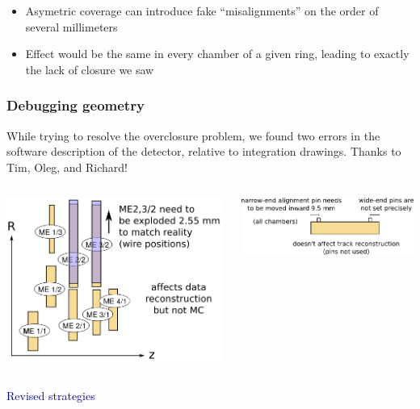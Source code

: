 \documentclass[compress]{beamer}
\begin{document}
\begin{frame}
\begin{columns}
\end{columns}

\vfill
\begin{itemize}
\item Asymetric coverage can introduce fake ``misalignments'' on the order of several millimeters
\item Effect would be the same in every chamber of a given ring, leading to exactly the lack of closure we saw
\end{itemize}
\end{frame}

\begin{frame}
\frametitle{Debugging geometry}
\small

\vfill
While trying to resolve the overclosure problem, we found two errors
in the software description of the detector, relative to integration
drawings.  Thanks to Tim, Oleg, and Richard!

\vfill
\begin{columns}
\hfill \includegraphics[width=0.85\linewidth]{expand_ME22_32.png}

\includegraphics[width=0.85\linewidth]{move_all_pins.png}
\end{columns}

\vfill 
\begin{columns}
\textcolor{darkblue}{\Large Revised strategies}


\end{columns}
\end{frame}
\end{document}
